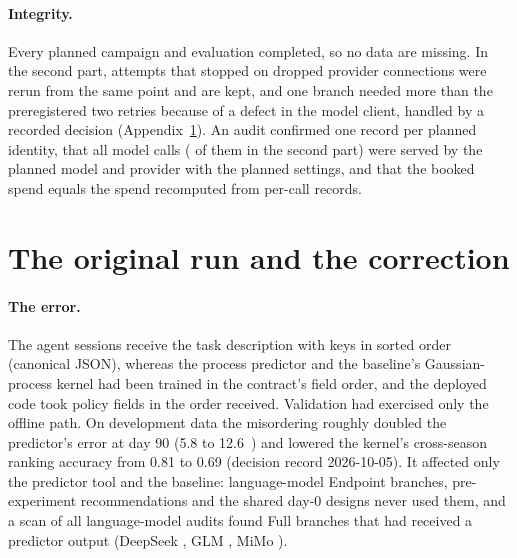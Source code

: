 \paragraph{Integrity.} Every planned campaign and evaluation completed, so no data are missing. In the second part,  attempts that stopped on dropped provider connections were rerun from the same point and are kept, and one branch needed more than the preregistered two retries because of a defect in the model client, handled by a recorded decision (Appendix~\ref{app:original}). An audit confirmed one record per planned identity, that all  model calls ( of them in the second part) were served by the planned model and provider with the planned settings, and that the booked spend equals the spend recomputed from per-call records.

\section{The original run and the correction}
\label{app:original}
\paragraph{The error.} The agent sessions receive the task description with keys in sorted order (canonical JSON), whereas the process predictor and the baseline's Gaussian-process kernel had been trained in the contract's field order, and the deployed code took policy fields in the order received. Validation had exercised only the offline path. On development data the misordering roughly doubled the predictor's error at day 90 (5.8 to 12.6~\eur{}) and lowered the kernel's cross-season ranking accuracy from 0.81 to 0.69 (decision record 2026-10-05). It affected only the predictor tool and the baseline: language-model Endpoint branches, pre-experiment recommendations and the shared day-0 designs never used them, and a scan of all  language-model audits found  Full branches that had received a predictor output (DeepSeek , GLM , MiMo ).

